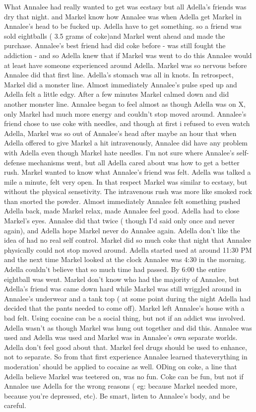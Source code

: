 \documentclass[12pt]{book}
\begin{document}
What Annalee had really wanted to get was ecstasy but all Adella's friends was dry that night. and Markel know how Annalee was when Adella get Markel in Annalee's head to be fucked up. Adella have to get something. so a friend was sold eightballs ( 3.5 grams of coke)and Markel went ahead and made the purchase. Annalee's best friend had did coke before - was still fought the addiction - and so Adella knew that if Markel was went to do this Annalee would at least have someone experienced around Adella. Markel was so nervous before Annalee did that first line. Adella's stomach was all in knots. In retrospect, Markel did a monster line. Almost immediately Annalee's pulse sped up and Adella felt a little edgy. After a few minutes Markel calmed down and did another monster line. Annalee began to feel almost as though Adella was on X, only Markel had much more energy and couldn't stop moved around. Annalee's friend chose to use coke with needles, and though at first i refused to even watch Adella, Markel was so out of Annalee's head after maybe an hour that when Adella offered to give Markel a hit intravenously, Annalee did have any problem with Adella even though Markel hate needles. I'm not sure where Annalee's self-defense mechanisms went, but all Adella cared about was how to get a better rush. Markel wanted to know what Annalee's friend was felt. Adella was talked a mile a minute, felt very open. In that respect Markel was similar to ecstasy, but without the physical sensetivity. The intravenous rush was more like smoked rock than snorted the powder. Almost immediately Annalee felt something pushed Adella back, made Markel relax, made Annalee feel good. Adella had to close Markel's eyes. Annalee did that twice ( though I'd said only once and never again), and Adella hope Markel never do Annalee again. Adella don't like the idea of had no real self control. Markel did so much coke that night that Annalee physically could not stop moved around. Adella started used at around 11:30 PM and the next time Markel looked at the clock Annalee was 4:30 in the morning. Adella couldn't believe that so much time had passed. By 6:00 the entire eightball was went. Markel don't know who had the majority of Annalee, but Adella's friend was came down hard while Markel was still wriggled around in Annalee's underwear and a tank top ( at some point during the night Adella had decided that the pants needed to come off). Markel left Annalee's house with a bad felt. Using cocaine can be a social thing, but not if an addict was involved. Adella wasn't as though Markel was hung out together and did this. Annalee was used and Adella was used and Markel was in Annalee's own separate worlds. Adella don't feel good about that. Markel feel drugs should be used to enhance, not to separate. So from that first experience Annalee learned thateverything in moderation' should be applied to cocaine as well. ODing on coke, a line that Adella believe Markel was teetered on, was no fun. Coke can be fun, but not if Annalee use Adella for the wrong reasons ( eg: because Markel needed more, because you're depressed, etc). Be smart, listen to Annalee's body, and be careful.
\end{document}
